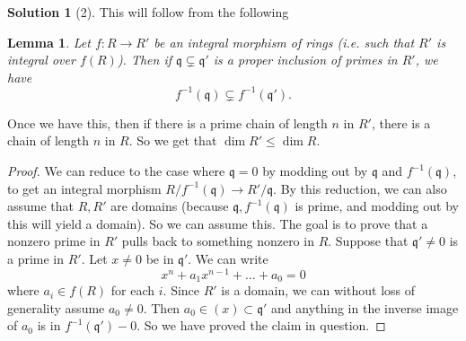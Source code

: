 \documentclass{article}
\newtheorem{lemma}{Lemma}
\theoremstyle{definition}
\newtheorem*{solution}{Solution}
\begin{document}
\begin{solution}[2] 

This will follow from the following
\begin{lemma} 
Let $f: R \to R'$ be an integral morphism of rings (i.e. such that $R'$ is
integral over $f(R)$). Then if $\mathfrak{q} \subsetneq \mathfrak{q}'$ is a proper
inclusion of primes in $R'$, we have
\[ f^{-1}(\mathfrak{q}) \subsetneq f^{-1}(\mathfrak{q}').  \]
\end{lemma} 

Once we have this, then if there is a prime chain of length $n$ in $R'$, there
is a chain of length $n$ in $R$. So we get that $\dim R' \leq \dim R$.
\begin{proof} 
We can reduce to the case where $\mathfrak{q}=0$ by modding out by
$\mathfrak{q}$ and $f^{-1}(\mathfrak{q})$, to get an integral morphism
$R/f^{-1}(\mathfrak{q}) \to R'/\mathfrak{q}$. By this reduction, we can also
assume that $R, R'$ are domains (because $\mathfrak{q}, f^{-1}(\mathfrak{q})$ is prime, and
modding out by this will yield a domain).
So we can assume this. The goal is to prove that a nonzero prime in $R'$
pulls back to something nonzero in $R$. Suppose that $\mathfrak{q}' \neq 0$ is a
prime in $R'$. Let $x \neq 0$ be in $\mathfrak{q}'$. We can write
\[ x^n + a_1 x^{n-1} + \dots + a_0 = 0  \]
where $a_i \in f(R)$ for each $i$. Since $R'$ is a domain, we can without loss
of generality assume $a_0 \neq 0$. Then $a_0 \in (x) \subset \mathfrak{q}'$ and
anything in the inverse image of $a_0$ is in $f^{-1}(\mathfrak{q}')-0$. So we
have proved the claim in question.
\end{proof}

\end{solution}
\end{document}
